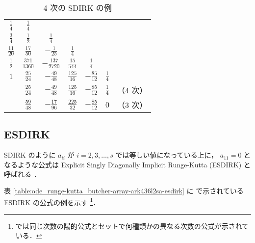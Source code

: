 \begin{table}[bp]
    \caption{4 次の SDIRK の例 \cite[Section IV.6.]{Hairer1991}}
    \label{table:ode_runge-kutta_butcher-array-sdirk-4}
    \centering
    \begin{tabular}{c|cccccc}
        $\frac{1}{4}$   & $\frac{1}{4}$      &                     &                  &                  &               &       \\
        $\frac{3}{4}$   & $\frac{1}{2}$      & $\frac{1}{4}$       &                  &                  &               &       \\
        $\frac{11}{20}$ & $\frac{17}{50}$    & $-\frac{1}{25}$     & $\frac{1}{4}$    &                  &               &       \\
        $\frac{1}{2}$   & $\frac{371}{1360}$ & $-\frac{137}{2720}$ & $\frac{15}{544}$ & $\frac{1}{4}$    &               &       \\
        $1$             & $\frac{25}{24}$    & $-\frac{49}{48}$    & $\frac{125}{16}$ & $-\frac{85}{12}$ & $\frac{1}{4}$ &       \\
        \hline
                        & $\frac{25}{24}$    & $-\frac{49}{48}$    & $\frac{125}{16}$ & $-\frac{85}{12}$ & $\frac{1}{4}$ & （4 次） \\
                        & $\frac{59}{48}$    & $-\frac{17}{96}$    & $\frac{225}{32}$ & $-\frac{85}{12}$ & $0$           & （3 次）
    \end{tabular}
\end{table}

\subsection{ESDIRK}

SDIRK のように $a_{ii}$ が $i = 2, 3, \ldots, s$ では等しい値になっている上に，
$a_{11} = 0$ となるような公式は
Explicit Singly Diagonally Implicit Runge-Kutta (ESDIRK) と呼ばれる
\cite{Jorgensen2018}．

表 \ref{table:ode_runge-kutta_butcher-array-ark436l2sa-esdirk} に
\cite{Kennedy2003} で示されている ESDIRK の公式の例を示す
\footnote{\cite{Kennedy2003} では同じ次数の陽的公式とセットで何種類かの異なる次数の公式が示されている．}．

